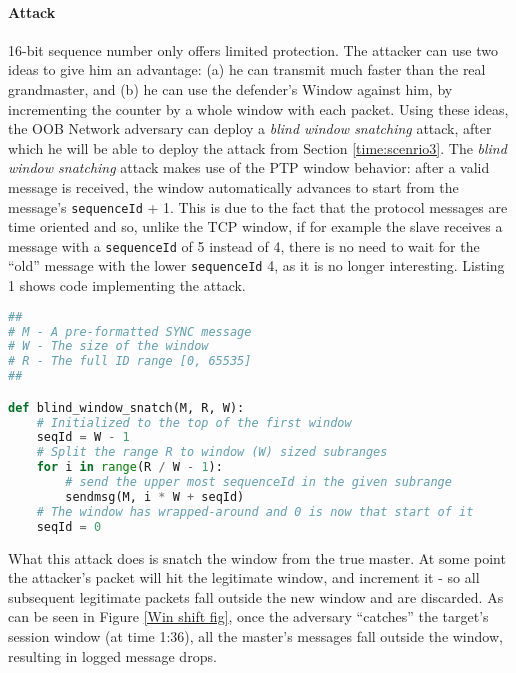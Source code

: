 \documentclass[11pt]{article}
\begin{document}
\paragraph{Attack}

16-bit sequence number only offers limited protection. The attacker can use two ideas to give him an advantage: (a) he can transmit much faster than the real grandmaster, and (b) he can use the defender's Window against him, by incrementing the counter by a whole window with each packet. Using these ideas, the OOB Network adversary can deploy a \emph{blind window snatching} attack, after which he will be able to deploy the attack from Section \ref{time:scenrio3}. The \emph{blind window snatching} attack makes use of the PTP window behavior: after a valid message is received, the window automatically advances to start from the message's \texttt{sequenceId} + 1. This is due to the fact that the protocol messages are time oriented and so, unlike the TCP window, if for example the slave receives a message with a \texttt{sequenceId} of 5 instead of 4, there is no need to wait for the ``old'' message with the lower \texttt{sequenceId} 4, as it is no longer interesting. Listing 1 shows code implementing the attack.



\renewcommand{\ttdefault}{pcr}

\begin{lstlisting}[float,floatplacement=t,
					frame=single,
					language=Python,
					basicstyle=\ttfamily,
					keywordstyle=\ttfamily\bfseries,
					commentstyle=\ttfamily\itshape\color{gray!90},
					caption={Python code for the \emph{blind window snatching} attack}]
##
# M - A pre-formatted SYNC message
# W - The size of the window
# R - The full ID range [0, 65535]
##

def blind_window_snatch(M, R, W):
    # Initialized to the top of the first window
    seqId = W - 1
    # Split the range R to window (W) sized subranges
    for i in range(R / W - 1):
        # send the upper most sequenceId in the given subrange
        sendmsg(M, i * W + seqId)
    # The window has wrapped-around and 0 is now that start of it
    seqId = 0
\end{lstlisting}

\renewcommand{\ttdefault}{cmtt}



What this attack does is snatch the window from the true master. At some point the attacker's packet will hit the legitimate window, and increment it - so all subsequent legitimate packets fall outside the new window and are discarded. As can be seen in Figure \ref{Win shift fig}, once the adversary ``catches'' the target's session window (at time 1:36), all the master's messages fall outside the window, resulting in logged message drops.
\end{document}
